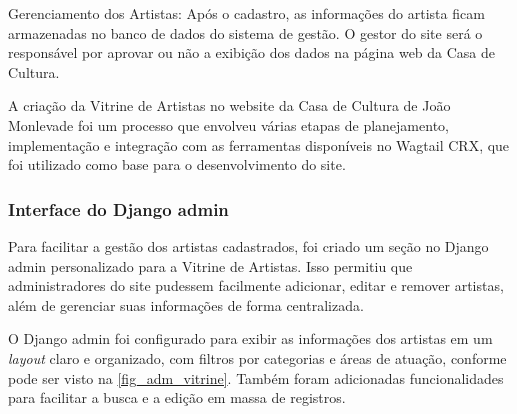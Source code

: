 Gerenciamento dos Artistas: Após o cadastro, as informações do artista ficam armazenadas no banco de dados do sistema de gestão. O gestor do site será o responsável por aprovar ou não a exibição dos dados na página web da Casa de Cultura.

A criação da Vitrine de Artistas no website da Casa de Cultura de João Monlevade foi um processo que envolveu várias etapas de planejamento, implementação e integração com as ferramentas disponíveis no Wagtail CRX, que foi utilizado como base para o desenvolvimento do site.


\subsubsection{Interface do Django admin}

Para facilitar a gestão dos artistas cadastrados, foi criado um seção no Django admin personalizado para a Vitrine de Artistas. Isso permitiu que administradores do site pudessem facilmente adicionar, editar e remover artistas, além de gerenciar suas informações de forma centralizada.

O Django admin foi configurado para exibir as informações dos artistas em um \textit{layout} claro e organizado, com filtros por categorias e áreas de atuação, conforme pode ser visto na \autoref{fig_adm_vitrine}. Também foram adicionadas funcionalidades para facilitar a busca e a edição em massa de registros.

